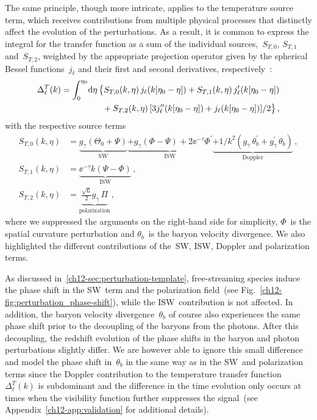 The same principle, though more intricate, applies to the temperature source term, which receives contributions from multiple physical processes that distinctly affect the evolution of the perturbations. As a result, it is common to express the integral for the transfer function as a sum of the individual sources,~$S_{T,0}$, $S_{T,1}$ and~$S_{T,2}$, weighted by the appropriate projection operator given by the spherical Bessel functions~$j_\ell$ and their first and second derivatives, respectively~\cite{Hu:1997hp}:
\begin{equation}
	\begin{split}
		\Delta^T_\ell(k) = \int_0^{\eta_0}\! \mathrm{d}\eta\,\bigl\{	& S_{T,0}(k,\eta)\, j_{\ell}(k[\eta_0-\eta]) + S_{T,1}(k,\eta)\, j^\prime_{\ell}(k[\eta_0-\eta])							\\
																&\!+ S_{T,2}(k,\eta) \left[3 j^{\prime\prime}_{\ell}(k[\eta_0-\eta]) + j_{\ell}(k[\eta_0-\eta])\right]\!/2 \bigr\}\, ,
	\end{split} \label{ch12-eq:transferT}
\end{equation}
with the respective source terms
\begin{align}
	S_{T,0}(k,\eta) &= \underbrace{g_\gamma\left(\Theta_0+ \Psi\right)}_{\text{SW}} \underbrace{+g_\gamma\left(\Phi-\Psi\right) +2 \ee^{-\tau} \Phi^\prime}_{\text{ISW}} \underbrace{+1/k^2\left(g_\gamma\,\theta_b^\prime+g_\gamma^\prime\,\theta_b\right)}_{\text{Doppler}}\, ,	\\[-1pt]
	S_{T,1}(k,\eta) &= \underbrace{\ee^{-\tau}k \left(\Psi-\Phi\right)}_{\text{ISW}}\, , 						\\
	S_{T,2}(k,\eta) &= \underbrace{\frac{\sqrt{6}}{2}g_\gamma\, \Pi}_{\text{polarization}}\, ,
\end{align}
where we suppressed the arguments on the right-hand side for simplicity, $\Phi$~is the spatial curvature perturbation and $\theta_b$~is the baryon velocity divergence. We also highlighted the different contributions of the~SW, ISW, Doppler and polarization terms.

As discussed in~\textsection\ref{ch12-sec:perturbation-template}, free-streaming species induce the phase shift in the SW~term and the polarization field~(see Fig.~\ref{ch12-fig:perturbation_phase-shift}), while the ISW~contribution is not affected. In addition, the baryon velocity divergence~$\theta_b$ of course also experiences the same phase shift prior to the decoupling of the baryons from the photons. After this decoupling, the redshift evolution of the phase shifts in the baryon and photon perturbations slightly differ. We are however able to ignore this small difference and model the phase shift in~$\theta_b$ in the same way as in the SW~and polarization terms since the Doppler contribution to the temperature transfer function~$\Delta^T_\ell(k)$ is subdominant and the difference in the time evolution only occurs at times when the visibility function further suppresses the signal~(see Appendix~\ref{ch12-app:validation} for additional details).\medskip

